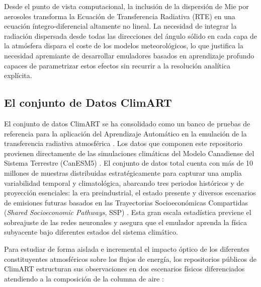 \documentclass[11pt,a4paper,twoside,pdf]{article}
\numberwithin{equation}{section}
\begin{document}
Desde el punto de vista computacional, la inclusión de la dispersión de Mie por aerosoles transforma la Ecuación de Transferencia Radiativa (RTE) en una ecuación íntegro-diferencial altamente no lineal. La necesidad de integrar la radiación dispersada desde todas las direcciones del ángulo sólido en cada capa de la atmósfera dispara el coste de los modelos meteorológicos, lo que justifica la necesidad apremiante de desarrollar emuladores basados en aprendizaje profundo capaces de parametrizar estos efectos sin recurrir a la resolución analítica explícita.

\subsection{El conjunto de Datos ClimART}

El conjunto de datos ClimART se ha consolidado como un banco de pruebas de referencia para la aplicación del Aprendizaje Automático en la emulación de la transferencia radiativa atmosférica \cite{ClimART2021}. Los datos que componen este repositorio provienen directamente de las simulaciones climáticas del Modelo Canadiense del Sistema Terrestre (CanESM5) \cite{ClimART2021}. El conjunto de datos total cuenta con más de 10 millones de muestras distribuidas estratégicamente para capturar una amplia variabilidad temporal y climatológica, abarcando tres periodos históricos y de proyección esenciales: la era preindustrial, el estado presente y diversos escenarios de emisiones futuras basados en las Trayectorias Socioeconómicas Compartidas (\textit{Shared Socioeconomic Pathways}, SSP) \cite{ClimART2021}. Esta gran escala estadística previene el sobreajuste de las redes neuronales y asegura que el emulador aprenda la física subyacente bajo diferentes estados del sistema climático.

Para estudiar de forma aislada e incremental el impacto óptico de los diferentes constituyentes atmosféricos sobre los flujos de energía, los repositorios públicos de ClimART estructuran sus observaciones en dos escenarios físicos diferenciados atendiendo a la composición de la columna de aire \cite{ClimART2021}:
\end{document}
